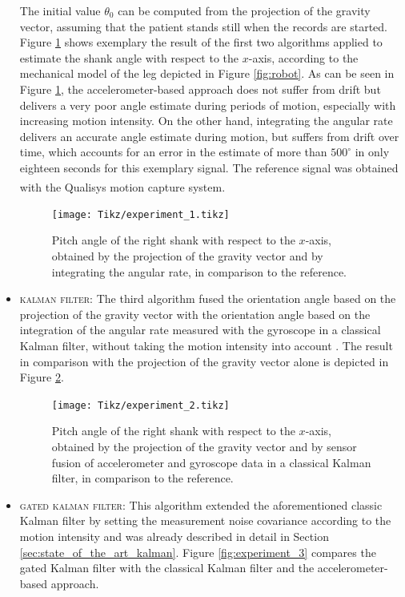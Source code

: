 \begin{itemize}
  \noindent The initial value $\theta_{0}$ can be computed from the projection of the gravity vector, assuming that the patient stands still when the records are started. Figure \ref{fig:experiment_1} shows exemplary the result of the first two algorithms applied to estimate the shank angle with respect to the $x$-axis, according to the mechanical model of the leg depicted in Figure \ref{fig:robot}. As can be seen in Figure \ref{fig:experiment_1}, the accelerometer-based approach does not suffer from drift but delivers a very poor angle estimate during periods of motion, especially with increasing motion intensity. On the other hand, integrating the angular rate delivers an accurate angle estimate during motion, but suffers from drift over time, which accounts for an error in the estimate of more than $500^{\circ}$ in only eighteen seconds for this exemplary signal. The reference signal was obtained with the Qualisys\textsuperscript{\textregistered} motion capture system.
  
\begin{figure}
	\centering
	\newlength\figureheight 
	\newlength\figurewidth 
	\setlength\figureheight{7cm} 
	\setlength\figurewidth{\textwidth}
	\texttt{[image: Tikz/experiment\_1.tikz]}
	\caption{Pitch angle of the right shank with respect to the $x$-axis, obtained by the projection of the gravity vector and by integrating the angular rate, in comparison to the reference.}
	\label{fig:experiment_1}
\end{figure}
  
  \item \textsc{kalman filter:} The third algorithm fused the orientation angle based on the projection of the gravity vector with the orientation angle based on the integration of the angular rate measured with the gyroscope in a classical Kalman filter, without taking the motion intensity into account \cite{olivares_vicente_gaitwatch_2013}. The result in comparison with the projection of the gravity vector alone is depicted in Figure \ref{fig:experiment_2}.

\begin{figure}
	\centering
	\setlength\figureheight{7cm} 
	\setlength\figurewidth{\textwidth}
	\texttt{[image: Tikz/experiment\_2.tikz]}
	\caption{Pitch angle of the right shank with respect to the $x$-axis, obtained by the projection of the gravity vector and by sensor fusion of accelerometer and gyroscope data in a classical Kalman filter, in comparison to the reference.}
	\label{fig:experiment_2}
\end{figure}
  
  \item \textsc{gated kalman filter:} This algorithm extended the aforementioned classic Kalman filter by setting the measurement noise covariance according to the motion intensity \cite{olivares_vicente_gaitwatch_2013} and was already described in detail in Section \ref{sec:state_of_the_art_kalman}. Figure \ref{fig:experiment_3} compares the gated Kalman filter with the classical Kalman filter and the accelerometer-based approach.
  \end{itemize}
  
